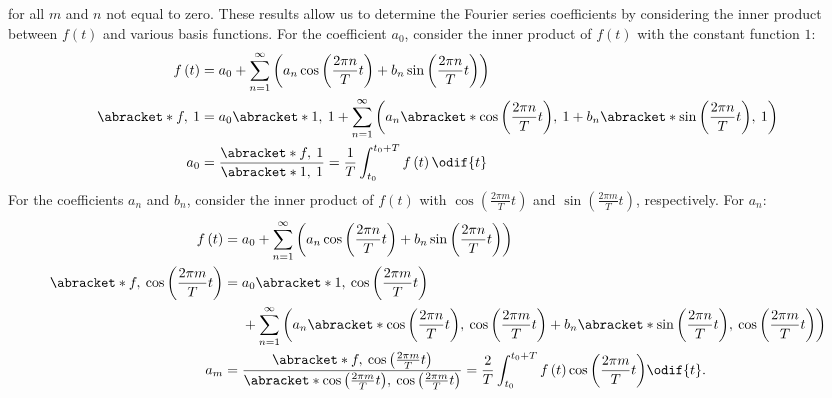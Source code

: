 \documentclass{article}
\begin{document}
for all \(m\) and \(n\) not equal to zero.
These results allow us to determine the Fourier series coefficients by
considering the inner product between \(f\left( t \right)\) and various
basis functions. For the coefficient \(a_0\), consider the inner product
of \(f\left( t \right)\) with the constant function \(1\):
\begin{align*}
    f\left( t \right)  & = a_0 + \sum_{n=1}^{\infty} \left( a_n \cos{\left( \frac{2\pi n}{T} t \right)} + b_n \sin{\left( \frac{2\pi n}{T} t \right)} \right)                                                      \\
    \abracket*{f,\: 1} & = a_0 \abracket*{1,\: 1} + \sum_{n=1}^{\infty} \left( a_n \abracket*{\cos{\left( \frac{2\pi n}{T} t \right)},\: 1} + b_n \abracket*{\sin{\left( \frac{2\pi n}{T} t \right)},\: 1} \right) \\
    a_0                & = \frac{\abracket*{f,\: 1}}{\abracket*{1,\: 1}} = \frac{1}{T} \int_{t_0}^{t_0 + T} f\left( t \right) \odif{t}
\end{align*}
For the coefficients \(a_n\) and \(b_n\), consider the inner product of
\(f\left( t \right)\) with \(\cos{\left( \frac{2\pi m}{T} t \right)}\)
and \(\sin{\left( \frac{2\pi m}{T} t \right)}\), respectively. For \(a_n\):
\begin{align*}
    f\left( t \right)                                        & = a_0 + \sum_{n=1}^{\infty} \left( a_n \cos{\left( \frac{2\pi n}{T} t \right)} + b_n \sin{\left( \frac{2\pi n}{T} t \right)} \right)                                                                                                                                     \\
    \abracket*{f,\: \cos{\left( \frac{2\pi m}{T} t \right)}} & =
    \begin{aligned}[t]
         & a_0 \abracket*{1,\: \cos{\left( \frac{2\pi m}{T} t \right)}}                                                                                                                                                                                 \\
         & + \sum_{n=1}^{\infty} \left( a_n \abracket*{\cos{\left( \frac{2\pi n}{T} t \right)},\: \cos{\left( \frac{2\pi m}{T} t \right)}} + b_n \abracket*{\sin{\left( \frac{2\pi n}{T} t \right)},\: \cos{\left( \frac{2\pi m}{T} t \right)}} \right)
    \end{aligned}
    \\
    a_m                                                      & = \frac{\abracket*{f,\: \cos{\left( \frac{2\pi m}{T} t \right)}}}{\abracket*{\cos{\left( \frac{2\pi m}{T} t \right)},\: \cos{\left( \frac{2\pi m}{T} t \right)}}} = \frac{2}{T} \int_{t_0}^{t_0 + T} f\left( t \right) \cos{\left( \frac{2\pi m}{T} t \right)} \odif{t}.
\end{align*}
\end{document}
